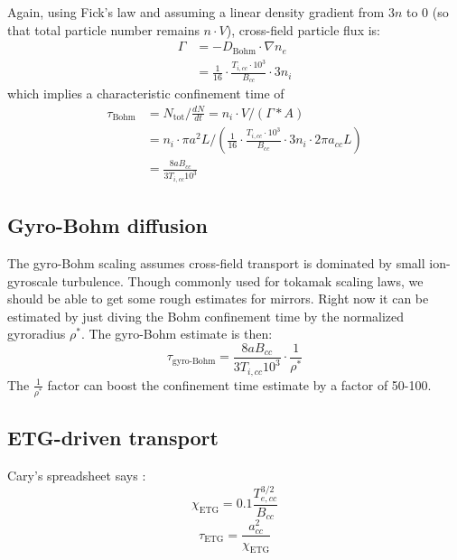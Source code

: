 Again, using Fick's law and assuming a linear density gradient from $3 n$ to 0 (so that total particle number remains $n \cdot V$), cross-field particle flux is:
\begin{align}
    \Gamma &= - D_\text{Bohm} \cdot \nabla n_e \\
    & = \frac{1}{16} \cdot \frac{T_{i,cc} \cdot 10^3}{B_{cc}} \cdot 3 n_i
\end{align}
which implies a characteristic confinement time of
\begin{align}
    \tau_\text{Bohm} &= N_\text{tot} \bigg/ \frac{dN}{dt} = n_i \cdot V / \left(\Gamma * A\right) \\
    &= n_i \cdot \pi a^2 L \bigg/ \left(\frac{1}{16} \cdot \frac{T_{i,cc} \cdot 10^3}{B_{cc}} \cdot 3 n_i \cdot 2 \pi a_{cc} L\right) \\
    &= \frac{8 a B_{cc}}{3 T_{i,cc} 10^3}
\end{align}

\subsection{Gyro-Bohm diffusion}

The gyro-Bohm scaling assumes cross-field transport is dominated by small ion-gyroscale turbulence. Though commonly used for tokamak scaling laws, we should be able to get some rough estimates for mirrors. Right now it can be estimated by just diving the Bohm confinement time by the normalized gyroradius $\rho^*$.
The gyro-Bohm estimate is then:
\begin{equation}
    \tau_\text{gyro-Bohm} = \frac{8 a B_{cc}}{3 T_{i,cc} 10^3} \cdot \frac{1}{\rho^*}
\end{equation}
The $\frac{1}{\rho^*}$ factor can boost the confinement time estimate by a factor of 50-100. 

\subsection{ETG-driven transport}

Cary's spreadsheet says :
\begin{equation}
    \chi_\text{ETG} = 0.1 \frac{T_{e,cc}^{3/2}}{B_{cc}}
\end{equation}
\begin{equation}
    \tau_\text{ETG} = \frac{a_{cc}^2}{\chi_\text{ETG}}
\end{equation}

